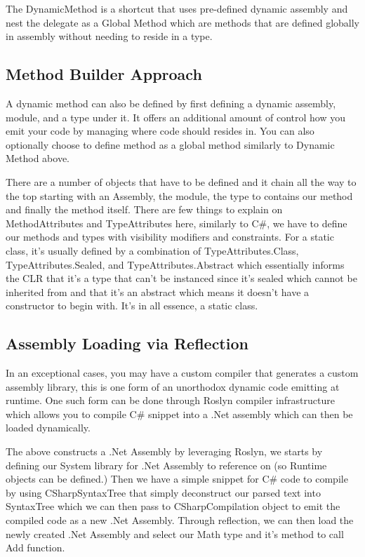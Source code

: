 

The DynamicMethod is a shortcut that uses pre-defined dynamic assembly and nest the delegate as a Global Method which are methods that are defined globally in assembly without needing to reside in a type.

\newpage

\subsection{Method Builder Approach}
A dynamic method can also be defined by first defining a dynamic assembly, module, and a type under it. It offers an additional amount of control how you emit your code by managing where code should resides in. You can also optionally choose to define method as a global method similarly to Dynamic Method above.



There are a number of objects that have to be defined and it chain all the way to the top starting with an Assembly, the module, the type to contains our method and finally the method itself. There are few things to explain on MethodAttributes and TypeAttributes here, similarly to C\#, we have to define our methods and types with visibility modifiers and constraints. For a static class, it's usually defined by a combination of TypeAttributes.Class, TypeAttributes.Sealed, and TypeAttributes.Abstract which essentially informs the CLR that it's a type that can't be instanced since it's sealed which cannot be inherited from and that it's an abstract which means it doesn't have a constructor to begin with. It's in all essence, a static class.

\newpage

\subsection{Assembly Loading via Reflection}
In an exceptional cases, you may have a custom compiler that generates a custom assembly library, this is one form of an unorthodox dynamic code emitting at runtime. One such form can be done through Roslyn compiler infrastructure which allows you to compile C\# snippet into a .Net assembly which can then be loaded dynamically.



The above constructs a .Net Assembly by leveraging Roslyn, we starts by defining our System library for .Net Assembly to reference on (so Runtime objects can be defined.) Then we have a simple snippet for C\# code to compile by using CSharpSyntaxTree that simply deconstruct our parsed text into SyntaxTree which we can then pass to CSharpCompilation object to emit the compiled code as a new .Net Assembly. Through reflection, we can then load the newly created .Net Assembly and select our Math type and it's method to call Add function.

